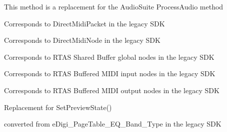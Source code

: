 \begin{DoxyRefList}
 This method is a replacement for the Audio\+Suite {\ttfamily Process\+Audio} method 
\item[Class \mbox{\hyperlink{a01792}{AAX\+\_\+\+CMidi\+Packet}} ]\label{a00880__porting_notes000003}%
%
 Corresponds to Direct\+Midi\+Packet in the legacy SDK  
\item[Class \mbox{\hyperlink{a01796}{AAX\+\_\+\+CMidi\+Stream}} ]\label{a00880__porting_notes000004}%
%
 Corresponds to Direct\+Midi\+Node in the legacy SDK  
\item[Member \mbox{\hyperlink{a00524_a5e1dffce35d05990dbbad651702678e4a2be91828f8c1dac20ab5dff136fc1fce}{AAX\+\_\+e\+MIDINode\+Type\+\_\+\+Global}} ]\label{a00880__porting_notes000029}%
%
 Corresponds to RTAS Shared Buffer global nodes in the legacy SDK  
\item[Member \mbox{\hyperlink{a00524_a5e1dffce35d05990dbbad651702678e4ae57de2b04978fe2e75f5bdeb034bda44}{AAX\+\_\+e\+MIDINode\+Type\+\_\+\+Local\+Input}} ]\label{a00880__porting_notes000027}%
%
 Corresponds to RTAS Buffered MIDI input nodes in the legacy SDK  
\item[Member \mbox{\hyperlink{a00524_a5e1dffce35d05990dbbad651702678e4acc1b5f2109c508b20a65b5e0fdcd643f}{AAX\+\_\+e\+MIDINode\+Type\+\_\+\+Local\+Output}} ]\label{a00880__porting_notes000028}%
%
 Corresponds to RTAS Buffered MIDI output nodes in the legacy SDK  
\item[Member \mbox{\hyperlink{a00524_afab5ea2cfd731fc8f163b6caa685406ea8ca3f7d5e93eecf945682f6fc55f5263}{AAX\+\_\+e\+Notification\+Event\+\_\+\+ASPreview\+State}} ]\label{a00880__porting_notes000021}%
%
 Replacement for {\ttfamily Set\+Preview\+State()}  
\item[Member \mbox{\hyperlink{a00524_aa169208a2ce713fa021e20deb2eaf608a99ca84cc3dae0f125082d36893a12bcd}{AAX\+\_\+e\+Page\+Table\+\_\+\+EQ\+\_\+\+Band\+\_\+\+Type}} ]\label{a00880__porting_notes000024}%
%
 converted from {\ttfamily e\+Digi\+\_\+\+Page\+Table\+\_\+\+EQ\+\_\+\+Band\+\_\+\+Type} in the legacy SDK 
\item[Member \mbox{\hyperlink{a00524_aa169208a2ce713fa021e20deb2eaf608ac5a06a293b7706191d3371813c47e999}{AAX\+\_\+e\+Page\+Table\+\_\+\+EQ\+\_\+\+In\+Circuit\+Polarity}} ]\label{a00880__porting_notes000025}%
%

\end{DoxyRefList}

